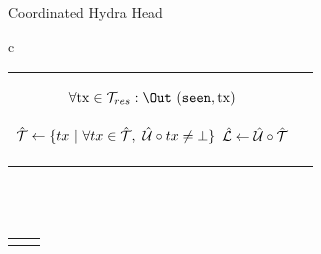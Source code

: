 \begin{figure*}[t!]
\begin{algobox}{Coordinated Hydra Head}
\begin{tabular}{c}
\begin{tabular}{c@{}c}
{\begin{walgo}{0.65}
{{{                $\forall \tx \in \mT_{res}: \Out~(\hpSeen,\tx)$ \; %

                \textcolor{blue}{
                  $\hat {\mathcal T} \gets \{ tx ~ | ~ \forall tx \in \hat {\mathcal T}, ~ \hat {\mathcal U} \circ tx \not = \bot \}$ \; %
                  $\hat {\mathcal L} \gets \hat {\mathcal U}\circ\hat {\mathcal T}$
                }
              }
            }
           }
          
        \end{walgo}
        }
        &

        \adjustbox{valign=t,scale=\sfact}{
        \begin{walgo}{0.6}
          \On{$(\hpAS,s,\msSig_j)$ from $\party_j$}{ %

            \textcolor{red}\Req{} $s \in \{\hats,\hats+1\}$
            \; %

            \Wait{$\hats=s$
            }{ %
            
            \textcolor{red}\Req{} $(j,\msSig_j) \notin \hatSigma$ \; %

            $\hatSigma \gets \hatSigma \cup (j,\msSig_j)$ \; %

            \If{$\forall k \in [1..n]: (k,\cdot) \in \hatSigma$}{ %
              $\msCSig \gets \msComb(\hydraKeys, \hatSigma)$ \; %

              $\eta' \gets (\hats, \combine(\hatmU))$ \; %
              \Req{} $\msVfy(\msCVK, (\cid || \eta_{0} || \eta'), \msCSig)$ \;
              $\barmU \gets \hatmU$ \; %
              $\bars \gets \hats$ \; %
              $\barsigma \gets \msCSig$ \; %

              $\forall \tx \in \mT_{res} : \Out (\hpConf,\tx)$ \; %

              \If{$\hats = \bars \land \hpLdr(\bars + 1) = i$}{%
                \Multi{} $(\hpRS,\bars+1,\hatmT^{\downarrow1})$ \;%
              }
            }
          } }
        \end{walgo}

          }

      \end{tabular}

      \\
      \\

      \begin{tabular}{c c}
        \adjustbox{valign=t,scale=\sfact}{
        \begin{walgo}{0.6}


\end{walgo}}
\end{tabular}
\end{tabular}
\end{algobox}
\end{figure*}
